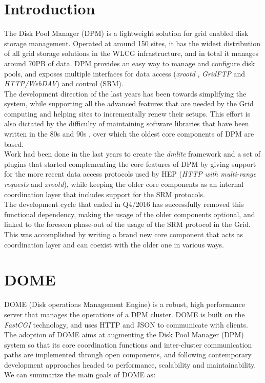 \documentclass[a4paper]{jpconf}
\begin{document}
\section{Introduction}
The Disk Pool Manager (DPM) is a lightweight solution for grid enabled disk storage
management. Operated at around 150 sites, it has the widest distribution of all grid storage
solutions in the WLCG infrastructure, and in total it manages around 70PB of data. DPM provides
an easy way to manage and configure disk pools, and exposes multiple interfaces for
data access (\textit{xrootd} \cite{xrd}, \textit{GridFTP} and \textit{HTTP/WebDAV}) and control (SRM).\\
The development direction of the last years has been towards simplifying the
system, while supporting all the advanced features that are needed by the Grid computing and
helping sites to incrementally renew their setups.
This effort is also dictated by the difficulty of maintaining software libraries that have been
written in the 80s and 90s \cite{libshift}, over which the oldest core components of DPM are based.\\
Work had been done in the last years to create the \textit{dmlite} \cite{dpmfuture} framework and a set of plugins
that started complementing the core features of DPM by giving support for the more recent
data access protocols used by HEP (\textit{HTTP with multi-range requests} and \textit{xrootd}),
while keeping the older core components as an internal coordination layer that includes
support for the SRM protocols.\\
The development cycle that ended in Q4/2016 has successfully removed this functional
dependency, making the usage of the older components optional, and linked to the
foreseen phase-out of the usage of the SRM protocol in the Grid. This was accomplished by
writing a brand new core component that acts as coordination layer and can coexist with the
older one in various ways.


\section{DOME}

DOME (Disk operations Management Engine) is a robust, high performance server that manages the operations of a DPM cluster. DOME is built on the \textit{FastCGI} \cite{fastcgi} technology,
and uses HTTP and JSON to communicate with clients.
The adoption of DOME aims at augmenting the Disk Pool Manager (DPM) system so that its core coordination functions and inter-cluster communication paths are
implemented through open components, and following contemporary development approaches headed to performance, scalability and maintainability. We can summarize the
main goals of DOME as:
\end{document}
